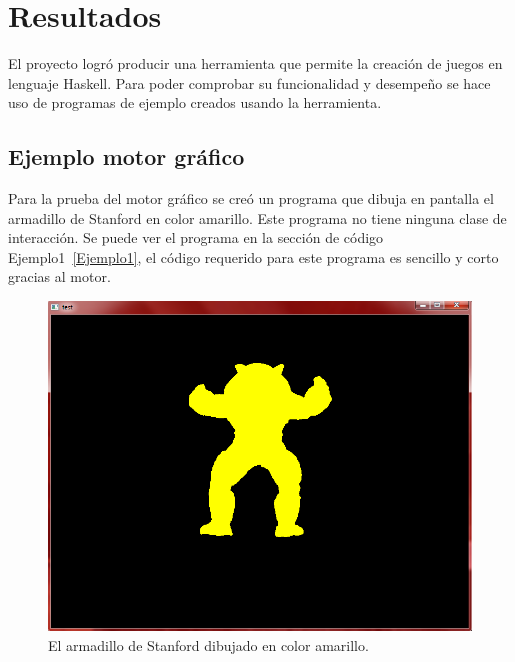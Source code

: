 
\chapter{Resultados}

\ifpdf
    \graphicspath{{resultados/Figs/Raster/}{resultados/Figs/PDF/}{resultados/Figs/}}
\else
    \graphicspath{{resultados/Figs/Vector/}{resultados/Figs/}}
\fi

El proyecto logró producir una herramienta que permite la creación de juegos en lenguaje Haskell. Para poder comprobar su funcionalidad y desempeño se hace uso de programas de ejemplo creados usando la herramienta.

\section{Ejemplo motor gráfico}

Para la prueba del motor gráfico se creó un programa que dibuja en pantalla el armadillo de Stanford en color amarillo. Este programa no tiene ninguna clase de interacción. Se puede ver el programa en la sección de código Ejemplo1~\ref{Ejemplo1}, el código requerido para este programa es sencillo y corto gracias al motor.

\begin{figure}[htbp!]
\centering
\includegraphics[width=1.0\textwidth]{sceenshot1}
\caption[Ejemplo 1]{El armadillo de Stanford dibujado en color amarillo.}
\end{figure}

